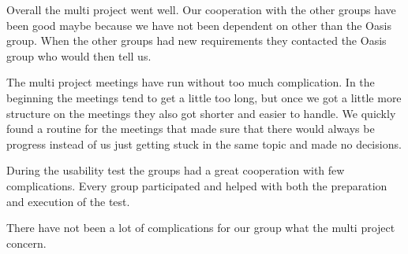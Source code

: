 Overall the multi project went well. Our cooperation with the other groups have been good maybe because we have not been dependent on other than the Oasis group. When the other groups had new requirements they contacted the Oasis group who would then tell us. 

The multi project meetings have run without too much complication. In the beginning the meetings tend to get a little too long, but once we got a little more structure on the meetings they also got shorter and easier to handle. We quickly found a routine for the meetings that made sure that there would always be progress instead of us just getting stuck in the same topic and made no decisions. 

During the usability test the groups had a great cooperation with few complications. Every group participated and helped with both the preparation and execution of the test. 

There have not been a lot of complications for our group what the multi project concern.